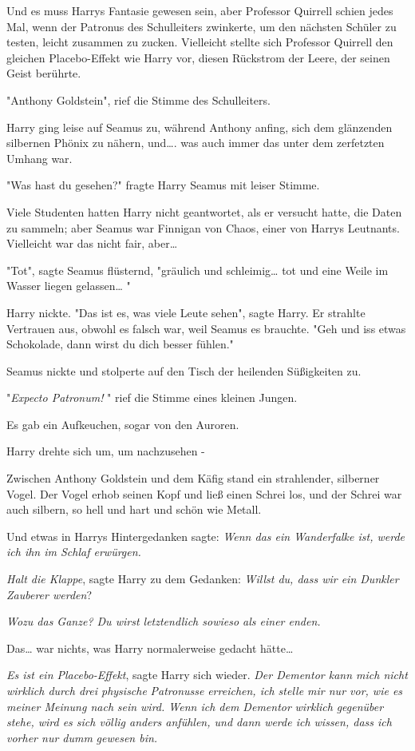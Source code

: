 {Und es muss Harrys Fantasie gewesen sein, aber Professor Quirrell schien jedes Mal, wenn der Patronus des Schulleiters zwinkerte, um den nächsten Schüler zu testen, leicht zusammen zu zucken. Vielleicht stellte sich Professor Quirrell den gleichen Placebo-Effekt wie Harry vor, diesen Rückstrom der Leere, der seinen Geist berührte.

"Anthony Goldstein", rief die Stimme des Schulleiters.

Harry ging leise auf Seamus zu, während Anthony anfing, sich dem glänzenden silbernen Phönix zu nähern, und…. was auch immer das unter dem zerfetzten Umhang war.

"Was hast du gesehen?" fragte Harry Seamus mit leiser Stimme.

Viele Studenten hatten Harry nicht geantwortet, als er versucht hatte, die Daten zu sammeln; aber Seamus war Finnigan von Chaos, einer von Harrys Leutnants. Vielleicht war das nicht fair, aber…

"Tot", sagte Seamus flüsternd, "gräulich und schleimig… tot und eine Weile im Wasser liegen gelassen… "

Harry nickte. "Das ist es, was viele Leute sehen", sagte Harry. Er strahlte Vertrauen aus, obwohl es falsch war, weil Seamus es brauchte. "Geh und iss etwas Schokolade, dann wirst du dich besser fühlen."

Seamus nickte und stolperte auf den Tisch der heilenden Süßigkeiten zu.

"\emph{Expecto Patronum!} " rief die Stimme eines kleinen Jungen.

Es gab ein Aufkeuchen, sogar von den Auroren.

Harry drehte sich um, um nachzusehen -

Zwischen Anthony Goldstein und dem Käfig stand ein strahlender, silberner Vogel. Der Vogel erhob seinen Kopf und ließ einen Schrei los, und der Schrei war auch silbern, so hell und hart und schön wie Metall.

Und etwas in Harrys Hintergedanken sagte: \emph{Wenn das ein Wanderfalke ist, werde ich ihn im Schlaf erwürgen.}

\emph{Halt die Klappe}, sagte Harry zu dem Gedanken: \emph{Willst du, dass wir ein Dunkler Zauberer werden}?

\emph{\emph{Wozu das Ganze? Du wirst letztendlich sowieso als einer enden.}}

Das… war nichts, was Harry normalerweise gedacht hätte…

\emph{Es ist ein Placebo-Effekt}, sagte Harry sich wieder. \emph{Der Dementor kann mich nicht wirklich durch drei physische} \emph{Patronusse} \emph{erreichen, ich stelle mir nur vor, wie es meiner Meinung nach} \emph{sein wird. Wenn ich dem Dementor} \emph{wirklich} \emph{gegenüber stehe, wird es sich völlig anders anfühlen, und dann werde ich wissen, dass ich vorher nur dumm} \emph{gewesen bin.}

}
